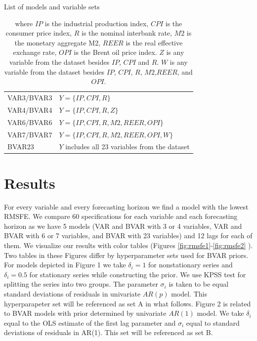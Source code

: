 \documentclass[11pt]{article} %
\begin{document}
\begin{table}
\begin{center}
\caption{List of models and variable sets}
\begin{tabular}{p{2.5cm}l}
\toprule
VAR3/BVAR3&$Y=\lbrace IP, CPI, R \rbrace$\\
VAR4/BVAR4 &$Y=\lbrace IP, CPI, R, Z\rbrace$ \\
VAR6/BVAR6& $Y=\lbrace IP, CPI, R, M2, REER, OPI \rbrace$ \\
VAR7/BVAR7&$Y=\lbrace IP, CPI, R, M2, REER, OPI, W \rbrace$\\
BVAR23&$Y$ includes all 23 variables from the dataset\\
\bottomrule
\end{tabular}
\vspace{5mm}
\caption*{where $IP$ is the industrial production index, $CPI$ is the consumer price index, $R$ is the nominal interbank rate, $M2$ is the monetary aggregate M2, $REER$ is the real effective exchange rate, $OPI$ is the Brent oil price index. $Z$ is any variable from the dataset besides $IP$, $CPI$ and $R$.  $W$ is any variable from the dataset besides $IP$, $CPI$, $R$, $M2$,$REER$, and $OPI$.}
\label{tab:models}
\end{center}
\end{table}

\section{Results}

For every variable and every forecasting horizon we find a model with the lowest RMSFE. We compare 60 specifications for each variable and each forecasting horizon as we have 5 models (VAR and BVAR with 3 or 4 variables, VAR and BVAR with 6 or 7 variables, and BVAR with 23 variables) and 12 lags for each of them. 
We visualize our results with color tables (Figures \ref{fig:rmsfe1}-\ref{fig:rmsfe2} ). 
Two tables in these Figures differ by hyperparameter sets used for BVAR priors. For models depicted in Figure 1  we take $\delta_i =1$ for nonstationary series and $\delta_i =0.5$ for stationary series while constructing the prior. We use KPSS test for splitting the series into two groups. The parameter $\sigma_i$ is taken to be equal standard deviations of residuals in univariate $AR(p)$ model. This hyperparapeter set will be referenced as set A in what follows. Figure 2 is related to BVAR models with prior determined by univariate $AR(1)$ model. We take $\delta_i$ equal to the OLS estimate of the first lag parameter and  $\sigma_i$ equal to standard deviations of residuals in AR(1). This set will be referenced as set B. 
\end{document}
